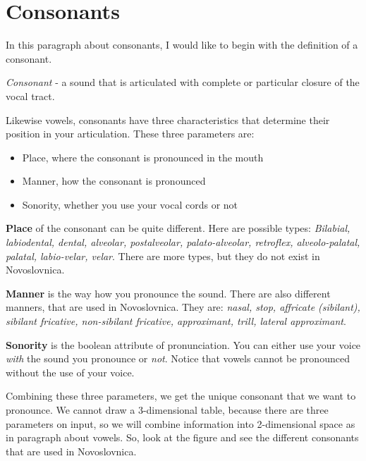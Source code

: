 \section{Consonants}

In this paragraph about consonants, I would like to begin with the definition of a consonant.

\textit{Consonant} - a sound that is articulated with complete or particular closure of the vocal tract. 

Likewise vowels, consonants have three characteristics that determine their position in your articulation. These three parameters are:

\begin{itemize}
	\item{Place, where the consonant is pronounced in the mouth}
	\item{Manner, how the consonant is pronounced }
	\item{Sonority, whether you use your vocal cords or not}
\end{itemize}

\textbf{Place} of the consonant can be quite different. Here are possible types: \textit{Bilabial, labiodental, dental, alveolar, postalveolar, palato-alveolar, retroflex, alveolo-palatal, palatal, labio-velar, velar}. There are more types, but they do not exist in Novoslovnica.

\textbf{Manner} is the way how you pronounce the sound. There are also different manners, that are used in Novoslovnica. They are: \textit{nasal, stop, affricate (sibilant), sibilant fricative, non-sibilant fricative, approximant, trill, lateral approximant}.

\textbf{Sonority} is the boolean attribute of pronunciation. You can either use your voice \textit{with} the sound you pronounce or \textit{not}. Notice that vowels cannot be pronounced without the use of your voice. 

Combining these three parameters, we get the unique consonant that we want to pronounce. We cannot draw  a 3-dimensional table, because there are three parameters on input, so we will combine information into 2-dimensional space as in paragraph about vowels. So, look at the figure and see the different consonants that are used in Novoslovnica.

